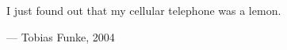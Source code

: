 \begin{flushright}
\begin{hangleftquote}{\QENOpen}{\QENClose}
I just found out that my cellular telephone was a lemon.
\end{hangleftquote}
\par\smallskip
\normalfont — Tobias Funke, 2004
\end{flushright}
